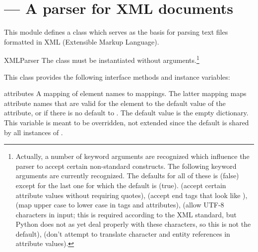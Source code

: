 \section{ ---
         A parser for XML documents}






This module defines a class  which serves as the basis 
for parsing text files formatted in XML (Extensible Markup Language).

\begin{classdesc}{XMLParser}{}
The  class must be instantiated without
arguments.\footnote{Actually, a number of keyword arguments are
recognized which influence the parser to accept certain non-standard
constructs.  The following keyword arguments are currently
recognized.  The defaults for all of these is  (false) except
for the last one for which the default is  (true).
 (accept certain attribute values
without requiring quotes),  (accept
end tags that look like \code{</>}),  (map upper case to
lower case in tags and attributes),  (allow UTF-8
characters in input; this is required according to the XML standard,
but Python does not as yet deal properly with these characters, so
this is not the default),  (don't
attempt to translate character and entity references in attribute values).}
\end{classdesc}

This class provides the following interface methods and instance variables:

\begin{memberdesc}{attributes}
A mapping of element names to mappings.  The latter mapping maps
attribute names that are valid for the element to the default value of 
the attribute, or if there is no default to .  The default
value is the empty dictionary.  This variable is meant to be
overridden, not extended since the default is shared by all instances
of .
\end{memberdesc}

